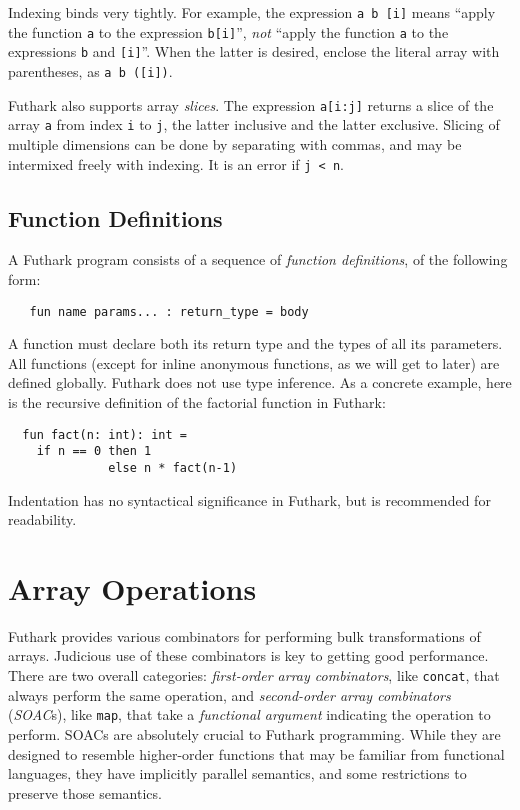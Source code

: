 \documentclass[11pt]{book}
\begin{document}
Indexing binds very tightly.  For example, the expression
\texttt{a~b~[i]} means ``apply the function \texttt{a} to the
expression \texttt{b[i]}'', \textit{not} ``apply the function
\texttt{a} to the expressions \texttt{b} and \texttt{[i]}''.  When the
latter is desired, enclose the literal array with parentheses, as
\texttt{a~b~([i])}.

Futhark also supports array \textit{slices}.  The expression
\texttt{a[i:j]} returns a slice of the array \texttt{a} from index
\texttt{i} to \texttt{j}, the latter inclusive and the latter
exclusive.  Slicing of multiple dimensions can be done by separating
with commas, and may be intermixed freely with indexing.  It is an
error if \texttt{j < n}.

\subsection{Function Definitions}
\label{sec:function-declarations}

A Futhark program consists of a sequence of \textit{function
  definitions}, of the following form:

\begin{lstlisting}
   fun name params... : return_type = body
\end{lstlisting}

A function must declare both its return type and the types of all its
parameters.  All functions (except for inline anonymous functions, as
we will get to later) are defined globally.  Futhark does not use type
inference.  As a concrete example, here is the recursive definition of
the factorial function in Futhark:

\begin{lstlisting}
  fun fact(n: int): int =
    if n == 0 then 1
              else n * fact(n-1)
\end{lstlisting}

Indentation has no syntactical significance in Futhark, but is
recommended for readability.

\section{Array Operations}

Futhark provides various combinators for performing bulk
transformations of arrays.  Judicious use of these combinators is key
to getting good performance.  There are two overall categories:
\textit{first-order array combinators}, like \texttt{concat}, that
always perform the same operation, and \textit{second-order array
  combinators} (\textit{SOAC}s), like \texttt{map}, that take a
\textit{functional argument} indicating the operation to perform.
SOACs are absolutely crucial to Futhark programming.  While they are
designed to resemble higher-order functions that may be familiar from
functional languages, they have implicitly parallel semantics, and
some restrictions to preserve those semantics.
\end{document}

